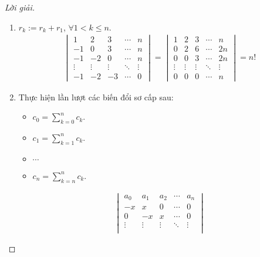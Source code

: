 \documentclass[class=linear-algebra,crop=false]{standalone}
\begin{document}
\begin{proof}[Lời giải]
	\begin{enumerate}[label = (\alph*)]
		\item $r_{k}:= r_{k} + r_{1}$, $\forall 1 < k\le n$.
		      \begin{align*}
			      \begin{vmatrix}
				      1      & 2      & 3      & \cdots & n      \\
				      -1     & 0      & 3      & \cdots & n      \\
				      -1     & -2     & 0      & \cdots & n      \\
				      \vdots & \vdots & \vdots & \ddots & \vdots \\
				      -1     & -2     & -3     & \cdots & 0
			      \end{vmatrix}
			      =
			      \begin{vmatrix}
				      1      & 2      & 3      & \cdots & n      \\
				      0      & 2      & 6      & \cdots & 2n     \\
				      0      & 0      & 3      & \cdots & 2n     \\
				      \vdots & \vdots & \vdots & \ddots & \vdots \\
				      0      & 0      & 0      & \cdots & n
			      \end{vmatrix}
			      = n!
		      \end{align*}
		\item Thực hiện lần lượt các biến đổi sơ cấp sau:
		      \begin{itemize}
			      \item $c_{0} = \displaystyle\sum^{n}_{k=0}c_{k}$.
			      \item $c_{1} = \displaystyle\sum^{n}_{k=1}c_{k}$.
			      \item $\cdots$
			      \item $c_{n} = \displaystyle\sum^{n}_{k=n}c_{k}$.
		      \end{itemize}
		      \begingroup{}
		      \allowdisplaybreaks{}
		      \begin{align*}
			      \begin{vmatrix}
				      a_{0}  & a_{1}  & a_{2}  & \cdots & a_{n}  \\
				      -x     & x      & 0      & \cdots & 0      \\
				      0      & -x     & x      & \cdots & 0      \\
				      \vdots & \vdots & \vdots & \ddots & \vdots \\

\end{vmatrix}
\end{align*}
\end{enumerate}
\end{proof}
\end{document}
